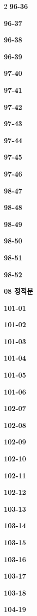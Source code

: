 \documentclass[10pt,a4paper]{article}
\begin{document}
\begin{multicols}{2}
\noindent\textbf{96-36}\ \par
\noindent\textbf{96-37}\ \par
\noindent\textbf{96-38}\ \par
\noindent\textbf{96-39}\ \par
\noindent\textbf{97-40}\ \par
\noindent\textbf{97-41}\ \par
\noindent\textbf{97-42}\ \par
\noindent\textbf{97-43}\ \par
\noindent\textbf{97-44}\ \par
\noindent\textbf{97-45}\ \par
\noindent\textbf{97-46}\ \par
\noindent\textbf{98-47}\ \par
\noindent\textbf{98-48}\ \par
\noindent\textbf{98-49}\ \par
\noindent\textbf{98-50}\ \par
\noindent\textbf{98-51}\ \par
\noindent\textbf{98-52}\ \par
\noindent\textbf{08 정적분}\par\smallskip
\noindent\textbf{101-01}\ \par
\noindent\textbf{101-02}\ \par
\noindent\textbf{101-03}\ \par
\noindent\textbf{101-04}\ \par
\noindent\textbf{101-05}\ \par
\noindent\textbf{101-06}\ \par
\noindent\textbf{102-07}\ \par
\noindent\textbf{102-08}\ \par
\noindent\textbf{102-09}\ \par
\noindent\textbf{102-10}\ \par
\noindent\textbf{102-11}\ \par
\noindent\textbf{102-12}\ \par
\noindent\textbf{103-13}\ \par
\noindent\textbf{103-14}\ \par
\noindent\textbf{103-15}\ \par
\noindent\textbf{103-16}\ \par
\noindent\textbf{103-17}\ \par
\noindent\textbf{103-18}\ \par
\noindent\textbf{104-19}\ \par

\end{multicols}
\end{document}
